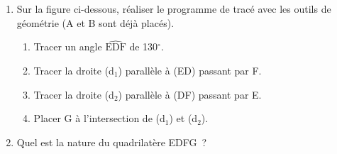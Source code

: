 \documentclass[exercice]{thedocument}%
\begin{document}
%
\begin{enumerate}
    \item Sur la figure ci-dessous, réaliser le programme de tracé avec les outils de
    géométrie (A et B sont déjà placés).
    \begin{enumerate}
        \item Tracer un angle $\widehat{\text{EDF}}$ de 130$^\circ$.
        \item Tracer la droite (d$_1$) parallèle à (ED) passant par F.
        \item Tracer la droite (d$_2$) parallèle à (DF) passant par E.
        \item Placer G à l'intersection de (d$_1$) et (d$_2$).
    \end{enumerate}
    \item Quel est la nature du quadrilatère EDFG~?
\end{enumerate}
\begin{center}\vskip30pt\noindent
\end{center}
\end{document}
